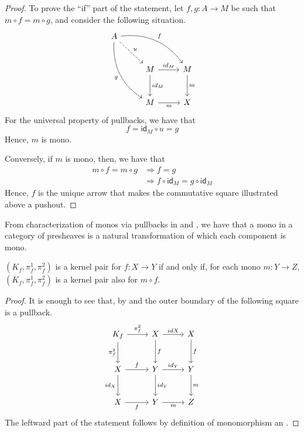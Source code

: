 \documentclass[runningheads,envcountsect]{lipics-v2021}
\newcommand{\id}[1]{\mathsf{id}_{#1}}
\begin{document}
\begin{proof}
    To prove the ``if'' part of the statement, let $f, g: A \to M$ be such that $m\circ f = m\circ g$, and consider the following situation.
    \[
        \begin{tikzcd}[row sep=26, column sep = 26]
        A \arrow[drr, bend left=30, "f"] \arrow[ddr, bend right=30,"g" swap] \arrow[dr, dashed, "u"] & & \\
        & M  \arrow[d, "{\id{M}}"] \arrow[r, "{\id{M}}"] & M \arrow[d, "m"] \\
        & M  \arrow[r, "m" swap] & X
        \end{tikzcd}
    \]
    For the universal property of pullbacks, we have that $$f  =  \id{M} \circ u =  g$$
    Hence, $m$ is mono.

    Conversely, if $m$ is mono, then, we have that
    \begin{align*}
        m \circ f = m \circ g   &\Rightarrow    f = g \\
                                &\Rightarrow    f \circ \id{M} = g\circ \id{M}
    \end{align*}
    Hence, $f$ is the unique arrow that makes the commutative square illustrated above a pushout.   
\end{proof}

\begin{remark}\label{rem:monos_in_presh_cats}
    From characterization of monos via pullbacks in  and , we have that a mono in a category of presheaves is a natural transformation of which each component is mono.
\end{remark}

\begin{corollary}\label{cor:kermono}
	$(K_f, \pi_f^1, \pi_f^2)$ is a kernel pair for $f\colon X\to Y$ if and only if, for each mono $m\colon Y\to Z$, $(K_f, \pi_f^1, \pi_f^2)$ is a kernel pair also for $m\circ f$.
\end{corollary}
\begin{proof}
    It is enough to see that, by  and  the outer boundary of the following square is a pullback.
        \[\begin{tikzcd}[row sep=13 pt, column sep=13 pt]
    	{K_f} && X && X \\
    	\\
    	X && Y && Y \\
    	\\
    	X && Y && Z
    	\arrow["{\pi_f^2}", from=1-1, to=1-3]
    	\arrow["{\pi_f^2}"', from=1-1, to=3-1]
    	\arrow["{id{X}}", from=1-3, to=1-5]
    	\arrow["f", from=1-3, to=3-3]
    	\arrow["f", from=1-5, to=3-5]
    	\arrow["f", from=3-1, to=3-3]
    	\arrow["{id_X}"', from=3-1, to=5-1]
    	\arrow["{id_Y}", from=3-3, to=3-5]
    	\arrow["{id_Y}", from=3-3, to=5-3]
    	\arrow["m", from=3-5, to=5-5]
    	\arrow["f"', from=5-1, to=5-3]
    	\arrow["m"', from=5-3, to=5-5]
    \end{tikzcd}\]
    The leftward part of the statement follows by definition of monomorphism an .   
\end{proof}
\end{document}
